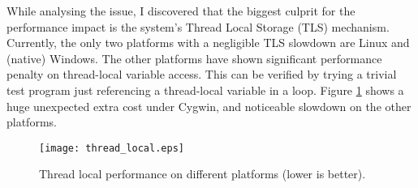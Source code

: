While analysing the issue, I discovered that the biggest culprit for the performance impact
is the system's Thread Local Storage (TLS) mechanism. Currently, the only two platforms
with a negligible TLS slowdown are Linux and (native) Windows. The other platforms
have shown significant performance penalty on thread-local variable access.
This can be verified by trying a trivial test
program just referencing a thread-local variable in a loop. Figure \ref{fig:threadlocal}
shows a huge unexpected extra cost under Cygwin, and noticeable slowdown on the other platforms.

\begin{figure}[H]
\centering
\texttt{[image: thread\_local.eps]}
\caption[Thread local performance on different platforms.]{Thread local performance on different platforms (lower is better).}
\label{fig:threadlocal}
\end{figure}
